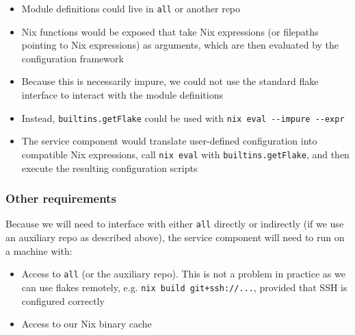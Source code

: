 \documentclass[11pt]{article}
\begin{document}
\begin{itemize}
\begin{itemize}
\item Module definitions could live in \texttt{all} or another repo
\item Nix functions would be exposed that take Nix expressions (or filepaths pointing to Nix expressions) as arguments, which are then evaluated by the configuration framework
\item Because this is necessarily impure, we could not use the standard flake interface to interact with the module definitions
\item Instead, \texttt{builtins.getFlake} could be used with \texttt{nix eval -{}-impure -{}-expr}
\item The service component would translate user-defined configuration into compatible Nix expressions, call \texttt{nix eval} with \texttt{builtins.getFlake}, and then execute the resulting configuration scripts
\end{itemize}
\end{itemize}
\subsubsection*{Other requirements}
\label{sec:org968c8a4}
Because we will need to interface with either \texttt{all} directly or indirectly (if we use an auxiliary repo as described above), the service component will need to run on a machine with:
\begin{itemize}
\item Access to \texttt{all} (or the auxiliary repo). This is not a problem in practice as we can use flakes remotely, e.g. \texttt{nix build git+ssh://...}, provided that SSH is configured correctly
\item Access to our Nix binary cache
\end{itemize}
\end{document}
